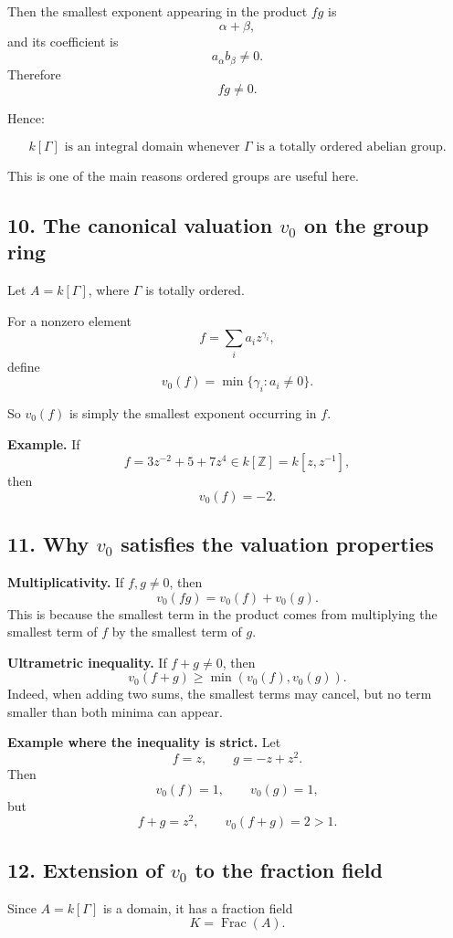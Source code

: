 \documentclass[12pt,a4paper]{article}
\theoremstyle{notespace}
\DeclareMathOperator{\Frac}{Frac}
\begin{document}
Then the smallest exponent appearing in the product \(fg\) is
\[
\alpha+\beta,
\]
and its coefficient is
\[
a_\alpha b_\beta \neq 0.
\]
Therefore
\[
fg\neq 0.
\]

Hence:

\[
k[\Gamma] \text{ is an integral domain whenever } \Gamma \text{ is a totally ordered abelian group.}
\]

This is one of the main reasons ordered groups are useful here.

\subsection{10. The canonical valuation \(v_0\) on the group ring}

Let \(A=k[\Gamma]\), where \(\Gamma\) is totally ordered.

For a nonzero element
\[
f=\sum_i a_i z^{\gamma_i},
\]
define
\[
v_0(f)=\min\{\gamma_i : a_i\neq 0\}.
\]

So \(v_0(f)\) is simply the smallest exponent occurring in \(f\).

\textbf{Example.}
If
\[
f=3z^{-2}+5+7z^4 \in k[\mathbb Z]=k[z,z^{-1}],
\]
then
\[
v_0(f)=-2.
\]

\subsection{11. Why \(v_0\) satisfies the valuation properties}

\textbf{Multiplicativity.}
If \(f,g\neq 0\), then
\[
v_0(fg)=v_0(f)+v_0(g).
\]
This is because the smallest term in the product comes from multiplying the smallest term of \(f\) by the smallest term of \(g\).

\textbf{Ultrametric inequality.}
If \(f+g\neq 0\), then
\[
v_0(f+g)\ge \min(v_0(f),v_0(g)).
\]
Indeed, when adding two sums, the smallest terms may cancel, but no term smaller than both minima can appear.

\textbf{Example where the inequality is strict.}
Let
\[
f=z, \qquad g=-z+z^2.
\]
Then
\[
v_0(f)=1,\qquad v_0(g)=1,
\]
but
\[
f+g=z^2,
\qquad
v_0(f+g)=2>1.
\]

\subsection{12. Extension of \(v_0\) to the fraction field}

Since \(A=k[\Gamma]\) is a domain, it has a fraction field
\[
K=\Frac(A).
\]
\end{document}
